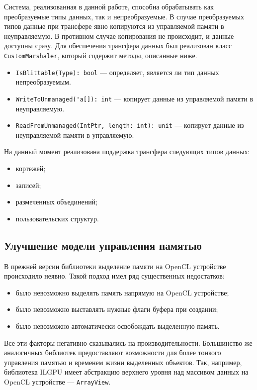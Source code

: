 Система, реализованная в данной работе, способна обрабатывать как преобразуемые типы данных, так и непреобразуемые. В случае преобразуемых типов данные при трансфере явно копируются из управляемой памяти в неуправляемую. В противном случае копирования не происходит, и данные доступны сразу. Для обеспечения трансфера данных был реализован класс \verb|CustomMarshaler|, который содержит методы, описанные ниже.
\begin{itemize}
    \item \verb|IsBlittable(Type): bool| --- определяет, является ли тип данных непреобразуемым.
    \item \verb|WriteToUnmanaged('a[]): int| --- копирует данные из управляемой памяти в неуправляемую. 
    \item \verb|ReadFromUnmanaged(IntPtr, length: int): unit| --- копирует данные из неуправляемой памяти в управляемую. 
\end{itemize}

На данный момент реализована поддержка трансфера следующих типов данных:
\begin{itemize}
    \item кортежей;
    \item записей;
    \item размеченных объединений;
    \item пользовательских структур.
\end{itemize}

\subsection{Улучшение модели управления памятью}
В прежней версии библиотеки выделение памяти на OpenCL устройстве происходило неявно. Такой подход имел ряд существенных недостатков:
\begin{itemize}
    \item было невозможно выделять память напрямую на OpenCL устройстве;
    \item было невозможно выставлять нужные флаги буфера при создании;
    \item было невозможно автоматически освобождать выделенную память.
\end{itemize}
Все эти факторы негативно сказывались на производительности. Большинство же аналогичных библиотек предоставляют возможности для более тонкого управления памятью и временем жизни выделенных объектов. Так, например, библиотека ILGPU имеет абстракцию верхнего уровня над массивом данных на OpenCL устройстве --- \verb|ArrayView|.

